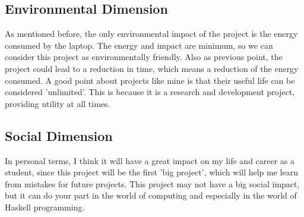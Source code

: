 \subsection{Environmental Dimension}
As mentioned before, the only environmental impact of the project is the energy consumed by the laptop. 
The energy and impact are minimum, so we can consider this project as environmentally friendly.
Also as previous point, the project could lead to a reduction in time, which means a reduction of the energy consumed.
A good point about projects like mine is that their useful life can be considered 'unlimited'.
This is because it is a research and development project, providing utility at all times.
\subsection{Social Dimension}
In personal terms, I think it will have a great impact on my life and career as a student, since this project will be the first 'big project', which will help me learn from mistakes for future projects.
This project may not have a big social impact, but it can do your part in the world of computing and especially in the world of Haskell programming.
